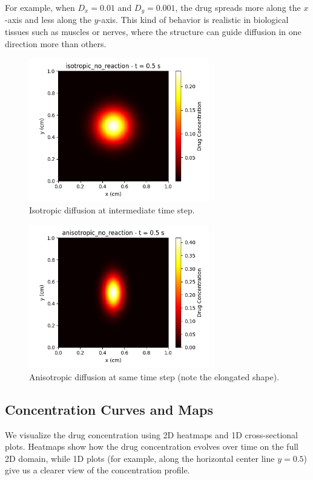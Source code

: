 \documentclass[11pt, a4paper]{article}
\begin{document}
For example, when \( D_x = 0.01 \) and \( D_y = 0.001 \), the drug spreads more along the \( x \)-axis and less along the \( y \)-axis. This kind of behavior is realistic in biological tissues such as muscles or nerves, where the structure can guide diffusion in one direction more than others.

\begin{figure}[h!]
  \centering
  \includegraphics[width=0.7\textwidth]{resources/isotropic_no_reaction/photos/diffusion_5.png}
  \caption{Isotropic diffusion at intermediate time step.}
  \label{fig:isotropic}
\end{figure}

\begin{figure}[h!]
  \centering
  \includegraphics[width=0.7\textwidth]{resources/anisotropic_no_reaction/photos/diffusion_5.png}
  \caption{Anisotropic diffusion at same time step (note the elongated shape).}
  \label{fig:anisotropic}
\end{figure}

\subsection{Concentration Curves and Maps}
We visualize the drug concentration using 2D heatmaps and 1D cross-sectional plots. Heatmaps show how the drug concentration evolves over time on the full 2D domain, while 1D plots (for example, along the horizontal center line \( y = 0.5 \)) give us a clearer view of the concentration profile.
\end{document}
